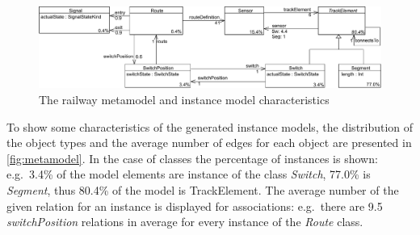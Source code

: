 \begin{figure}[Htb]
\begin{center}
\includegraphics[width=\textwidth]{figures/instance/TrainMMb.pdf}
\caption{The railway metamodel and instance model characteristics}
\label{fig:metamodel-instance-characteristics}
\end{center}
\end{figure}

To show some characteristics of the generated instance models, the distribution of the object types and the average number of edges for each object are presented in \autoref{fig:metamodel}. In the case of classes the percentage of instances is shown: e.g.\ 3.4\% of the model elements are instance of the class \emph{Switch}, 77.0\% is \emph{Segment}, thus 80.4\% of the model is TrackElement. The average number of the given relation for an instance is displayed for associations: e.g.\ there are 9.5 \emph{switchPosition} relations in average for every instance of the \emph{Route} class.
